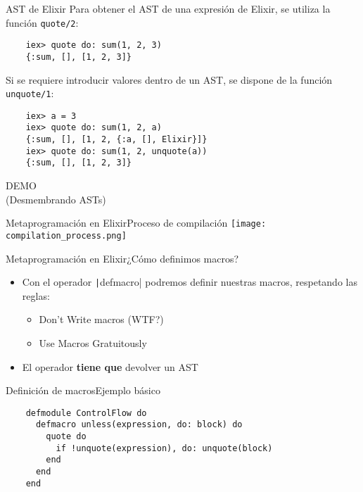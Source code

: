 \documentclass[14pt,aspectratio=169]{beamer}
\begin{document}
\begin{frame}[fragile]{AST de Elixir}
  Para obtener el AST de una expresión de Elixir, se utiliza la función
  \texttt{quote/2}:
  \footnotesize  \begin{verbatim}
    iex> quote do: sum(1, 2, 3)
    {:sum, [], [1, 2, 3]}
  \end{verbatim}
  \normalsize Si se requiere introducir valores dentro de un AST, se dispone de la función
  \texttt{unquote/1}:
  \footnotesize \begin{verbatim}
    iex> a = 3
    iex> quote do: sum(1, 2, a)
    {:sum, [], [1, 2, {:a, [], Elixir}]}
    iex> quote do: sum(1, 2, unquote(a))
    {:sum, [], [1, 2, 3]}
  \end{verbatim}
\end{frame}

\begin{frame}
  \centering
  \huge
  DEMO\\
  \large
  (Desmembrando ASTs)
\end{frame}

\begin{frame}{Metaprogramación en Elixir}{Proceso de compilación}
  \centering
  \texttt{[image: compilation\_process.png]}
\end{frame}

\begin{frame}{Metaprogramación en Elixir}{¿Cómo definimos macros?}
  \begin{itemize}
    \item Con el operador \texttt|defmacro| podremos definir
    nuestras macros, respetando las reglas\footnotemark[2]:
    \begin{itemize}
      \item Don't Write macros (WTF?)
      \item Use Macros Gratuitously
    \end{itemize}
    \item El operador \textbf{tiene que} devolver un AST
  \end{itemize}
\end{frame}

\begin{frame}[fragile]{Definición de macros}{Ejemplo básico}
  \begin{verbatim}
    defmodule ControlFlow do
      defmacro unless(expression, do: block) do
        quote do
          if !unquote(expression), do: unquote(block)
        end
      end
    end
  \end{verbatim}
\end{frame}
\end{document}
